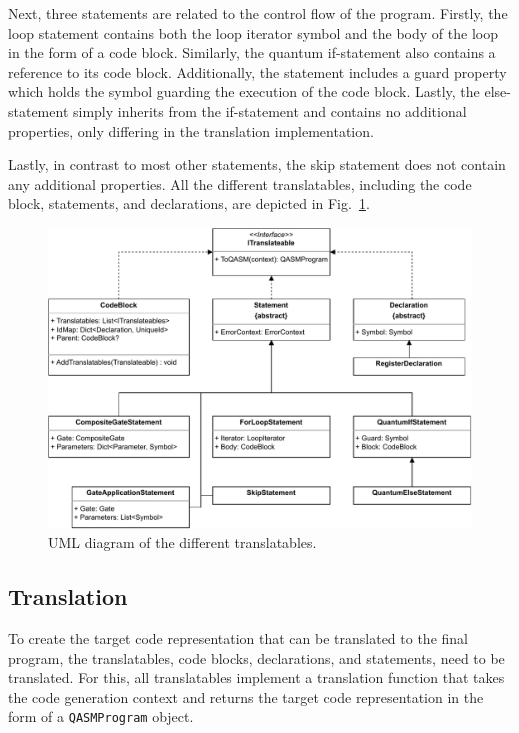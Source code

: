 Next, three statements are related to the control flow of the program. Firstly, the loop statement contains both the loop iterator symbol and the body of the loop in the form of a code block. Similarly, the quantum if-statement also contains a reference to its code block. Additionally, the statement includes a guard property which holds the symbol guarding the execution of the code block. Lastly, the else-statement simply inherits from the if-statement and contains no additional properties, only differing in the translation implementation.

Lastly, in contrast to most other statements, the skip statement does not contain any additional properties. All the different translatables, including the code block, statements, and declarations, are depicted in Fig.~\ref{fig:implementation_uml_translatables}. 

\begin{figure}[htp]
    \centering
    \includegraphics[width=.9\textwidth]{../figures/drawio/uml_translateables.pdf}
    \caption{UML diagram of the different translatables.}
    \label{fig:implementation_uml_translatables}
\end{figure}

\subsection{Translation}
\label{sec:implementation_translation}
To create the target code representation that can be translated to the final program, the translatables, \ie code blocks, declarations, and statements, need to be translated. For this, all translatables implement a translation function that takes the code generation context and returns the target code representation in the form of a \texttt{QASMProgram} object.

